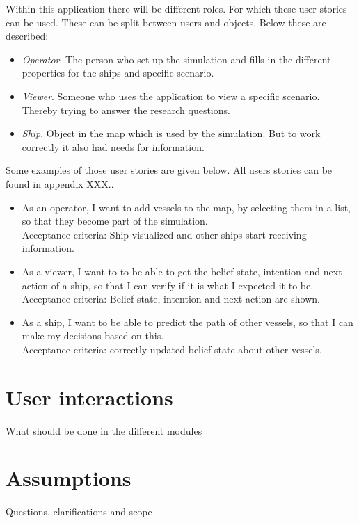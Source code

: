 Within this application there will be different roles. For which these user stories can be used. These can be split between users and objects. Below these are described:
\begin{itemize}
	\item \emph{Operator}. The person who set-up the simulation and fills in the different properties for the ships and specific scenario.
	\item \emph{Viewer}. Someone who uses the application to view a specific scenario. Thereby trying to answer the research questions.
	\item \emph{Ship}. Object in the map which is used by the simulation. But to work correctly it also had needs for information.
\end{itemize}

Some examples of those user stories are given below. All users stories can be found in appendix XXX.. 

\begin{itemize}
	\item As an operator, I want to add vessels to the map, by selecting them in a list, so that they become part of the simulation. \\
	Acceptance criteria: Ship visualized and other ships start receiving information.
	\item As a viewer, I want to to be able to get the belief state, intention and next action of a ship, so that I can verify if it is what I expected it to be. \\
	Acceptance criteria: Belief state, intention and next action are shown.
	\item As a ship, I want to be able to predict the path of other vessels, so that I can make my decisions based on this. \\
	Acceptance criteria: correctly updated belief state about other vessels.
\end{itemize}

\section{User interactions}
What should be done in the different modules

\section{Assumptions}
Questions, clarifications and scope
